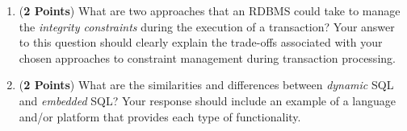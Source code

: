 \documentclass[12pt]{article}
\begin{document}
\begin{enumerate}
\begin{enumerate}
\item ({\bf 2 Points}) What are two approaches that an RDBMS could take
  to manage the {\em integrity constraints} during the execution of a
  transaction?  Your answer to this question should clearly explain the
  trade-offs associated with your chosen approaches to constraint
  management during transaction processing.

\item ({\bf 2 Points}) What are the similarities and differences
  between {\em dynamic} SQL and {\em embedded} SQL?  Your response
  should include an example of a language and/or platform that
  provides each type of functionality.


\end{enumerate}

\newpage 









\end{enumerate}
\end{document}
